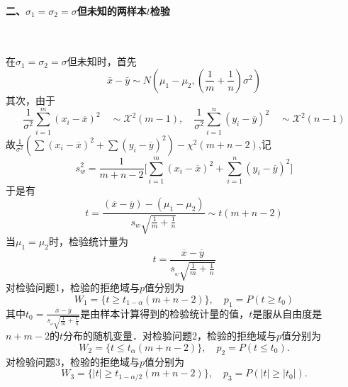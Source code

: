 \paragraph{二、$\sigma_1=\sigma_2=\sigma$但未知的两样本$t$检验}~{}

在$\sigma_1=\sigma_2=\sigma$但未知时，首先
$$\bar{x}-\bar{y}\sim N\left(\left.\mu_1-\mu_{2},\left(\frac{1}{m}+\frac{1}{n}\right)\sigma^{2}\right.\right)$$
其次，由于
$$\frac1{\sigma^2}\sum_{i=1}^m{(x_i-\overline{x})^2}\quad\sim{\mathcal X}^2(m-1),\quad\frac1{\sigma^2}\sum_{i=1}^n{(y_i-\overline{y})^2}\quad\sim{\mathcal X}^2(n-1)$$
故$\frac{1}{\sigma^{2}}(\sum(x_{i}-\overline{x})^{2}+\sum(y_{i}-\overline{y})^{2})-\chi^{2}(m+n-2)$,记
$$s_{w}^{2}=\frac{1}{m+n-2}\Big[\sum_{i=1}^{m}(x_{i}-\overline{x})^{2}+\sum_{i=1}^{n}(y_{i}-\overline{y})^{2}\Big]$$
于是有
$$t=\frac{(\overline{x}-\overline{y})-(\mu_{1}-\mu_{2})}{s_{w}\sqrt{\frac{1}{m}+\frac{1}{n}}}\sim t(m+n-2)$$
当$\mu_1=\mu_2$时，检验统计量为
$$t=\frac{\overline{x}-\overline{y}}{s_{_w}\sqrt{\frac1m+\frac1n}}$$
对检验问题1，检验的拒绝域与$p$值分别为
$$W_{1}= \{ t\geqslant t_{1-\alpha}(m+n-2)\},\quad p_{1}=P(t\geqslant t_{0})$$
其中$t_0=\frac{\overline{x}-\overline{y}}{s_{_w}\sqrt{\frac1m+\frac1n}}$是由样本计算得到的检验统计量的值，$t$是服从自由度是$n+m-2$的$t$分布的随机变量．对检验问题2，检验的拒绝域与$p$值分别为
$$W_{2}=\{ t\leq t_{\alpha}(m+n-2)\},\quad p_{2}=P(t\leq t_{0}).$$
对检验问题3，检验的拒绝域与$p$值分别为
$$W_{3}=\{ |t|\geq t_{1-\alpha/2}(m+n-2)\},\quad p_{3}=P(|t|\geq |t_{0}|).$$


